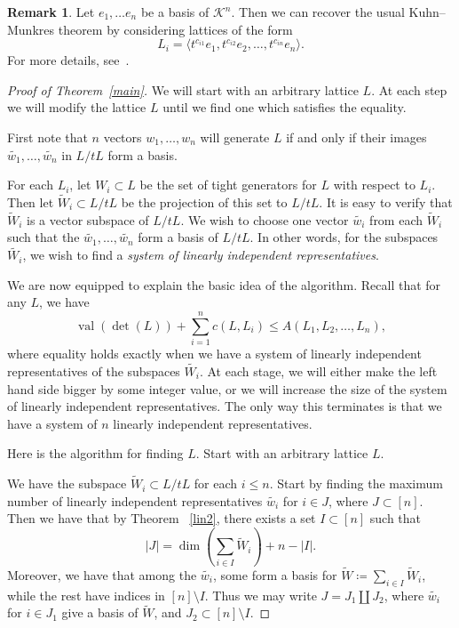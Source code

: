 \documentclass[10pt]{amsart}
\theoremstyle{definition}
\newtheorem{rema}[theorem]{Remark}
\newcommand{\cK}{\mathcal{K}}
\newcommand{\val}{\operatorname{val}}
\begin{document}
\begin{rema} Let $e_1, \dots e_n$ be a basis of $\cK^n$. Then we can recover the usual Kuhn--Munkres theorem by considering lattices of the form
\[
L_i = \langle t^{c_{i1}}e_1, t^{c_{i2}}e_2, \dots, t^{c_{in}}e_n\rangle .
\]
For more details, see~\cite{LO}.
\end{rema}



\begin{proof}[Proof of Theorem~\ref{main}] We will start with an arbitrary lattice $L$. At each step we will modify the lattice $L$ until we find one which satisfies the equality. 

First note that $n$ vectors $w_1, \dots, w_n$ will generate $L$ if and only if their images $\tilde{w_1}, \dots, \tilde{w_n}$ in $L/tL$ form a basis. 

For each $L_i$, let $W_i \subset L$ be the set of tight generators for $L$ with respect to $L_i$. Then let $\tilde{W}_i \subset L/tL$ be the projection of this set to $L/tL$. It is easy to verify that $\tilde{W}_i$ is a vector subspace of $L/tL$. We wish to choose one vector $\tilde{w_i}$ from each $\tilde{W}_i$ such that the $\tilde{w_1}, \dots, \tilde{w_n}$ form a basis of $L/tL$. In other words, for the subspaces $\tilde{W_i}$, we wish to find a \emph{system of linearly independent representatives}.

We are now equipped to explain the basic idea of the algorithm. Recall that for any $L$, we have
\[
\val(\det(L)) + \sum_{i=1}^n c(L,L_i) \leq A(L_1, L_2, \dots, L_n),
\]
where equality holds exactly when we have a system of linearly independent representatives of the subspaces $\tilde{W_i}$. At each stage, we will either make the left hand side bigger by some integer value, or we will increase the size of the system of linearly independent representatives. The only way this terminates is that we have a system of $n$ linearly independent representatives.

Here is the algorithm for finding $L$. Start with an arbitrary lattice $L$.

We have the subspace $\tilde{W}_i \subset L/tL$ for each $i \leq n$. Start by finding the maximum number of linearly independent representatives $\tilde{w_i}$ for $i \in J$, where $J \subset [n]$. Then we have that by Theorem ~\ref{lin2}, there exists a set $I \subset [n]$ such that 
\[
|J| = \dim \left( \sum_{i\in I} \tilde{W}_i \right) + n - |I|.
\]
Moreover, we have that among the $\tilde{w_i}$, some form a basis for $\tilde{W} \coloneqq  \sum_{i \in I} \tilde{W}_i$, while the rest have indices in $[n] \setminus I$. Thus we may write $J = J_1 \coprod J_2$, where $\tilde{w_i}$ for $i \in J_1$ give a basis of $\tilde{W}$, and $J_2 \subset [n] \setminus I.$


\end{proof}
\end{document}
